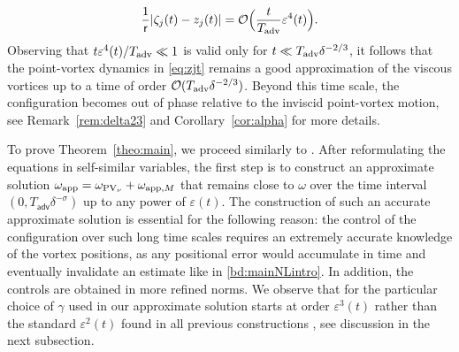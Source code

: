 \documentclass[11pt,reqno,a4paper]{amsart}
\def\eps{\varepsilon}
\newcommand{\cO}{\mathcal{O}}
\newcommand{\adv}{\mathsf{adv}}
\newcommand{\1}{\mathbbm{1}}
\theoremstyle{definition}
\theoremstyle{definition}
\numberwithin{equation}{section}
\begin{document}
\begin{equation}\label{maj:zeta_j}
  \frac{1}{\mathsf{r}}  |\zeta_j(t) - z_j(t)| = \cO\Big( \frac{t}{T_{\rm adv}} \eps^4(t) \Big).
\end{equation}
Observing that $t \eps^4(t) / T_{\rm adv} \ll 1$ is valid only for $t \ll T_{\rm adv} \delta^{-2/3}$, it follows that the point-vortex dynamics in \cref{eq:zjt} remains a good approximation of the viscous vortices up to a time of order $\cO(T_{\rm adv}\delta^{-2/3})$. Beyond this time scale, the configuration becomes out of phase relative to the inviscid point-vortex motion, see Remark~\ref{rem:delta23} and Corollary~\ref{cor:alpha} for more details.

To prove Theorem~\ref{theo:main}, we proceed similarly to \cite{dolce2024long}. After reformulating the equations in self-similar variables, the first step is to construct an approximate solution $\omega_{\rm app} = \omega_{\mathrm{PV}_\nu} + \omega_{{\rm app},M}$ that remains close to $\omega$ over the time interval $(0,T_\adv\delta^{-\sigma} )$ up to any power of $\eps(t)$. The construction of such an accurate approximate solution is essential for the following reason: the control of the configuration over such long time scales requires an extremely accurate knowledge of the vortex positions, as any positional error would accumulate in time and eventually invalidate an estimate like in \cref{bd:mainNLintro}.  
In addition, the controls are obtained in more refined norms. We observe that for the particular choice of $\gamma$ used in \cite{Donati_2025_Crystal} our approximate solution starts at order $\eps^3(t)$ rather than the standard $\eps^2(t)$ found in all previous constructions \cite{dolce2024long,zhang2025long}, see discussion in the next subsection.
\end{document}
